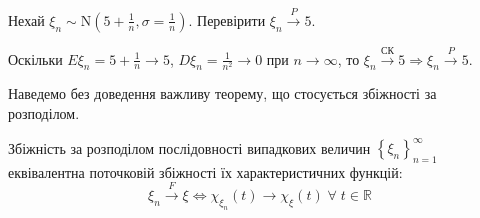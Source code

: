 \begin{example}
    Нехай $\xi_n \sim \mathrm{N}\left(5 + \frac{1}{n}, \sigma = \frac{1}{n}\right)$. Перевірити $\xi_n \overset{P}{\longrightarrow} 5$.
    
    \noindent Оскільки $E\xi_n = 5+\frac{1}{n} \to 5$, $D\xi_n = \frac{1}{n^2} \to 0$ при $n \to \infty$,
    то $\xi_n \overset{\text{СК}}{\longrightarrow} 5 \Rightarrow \xi_n \overset{P}{\longrightarrow} 5$.
\end{example}

Наведемо без доведення важливу теорему, що стосується збіжності за розподілом.

\begin{theorem*}
    Збіжність за розподілом послідовності випадкових величин $\left\{ \xi_n\right\}_{n=1}^{\infty}$ еквівалентна поточковій збіжності їх
    характеристичних функцій:
    $$ \xi_n \overset{F}{\longrightarrow} \xi \Longleftrightarrow \chi_{\xi_n}(t) \to \chi_\xi (t) \; \forall \; t\in \mathbb{R}$$
\end{theorem*}